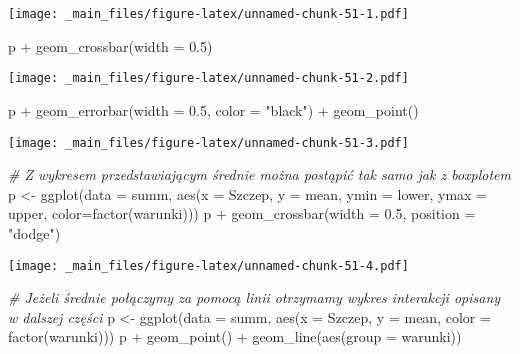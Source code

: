\documentclass[
]{book}
\newenvironment{Shaded}{\begin{snugshade}}{\end{snugshade}}
\newcommand{\AttributeTok}[1]{\textcolor[rgb]{0.77,0.63,0.00}{#1}}
\newcommand{\CommentTok}[1]{\textcolor[rgb]{0.56,0.35,0.01}{\textit{#1}}}
\newcommand{\FloatTok}[1]{\textcolor[rgb]{0.00,0.00,0.81}{#1}}
\newcommand{\FunctionTok}[1]{\textcolor[rgb]{0.00,0.00,0.00}{#1}}
\newcommand{\NormalTok}[1]{#1}
\newcommand{\OtherTok}[1]{\textcolor[rgb]{0.56,0.35,0.01}{#1}}
\newcommand{\SpecialCharTok}[1]{\textcolor[rgb]{0.00,0.00,0.00}{#1}}
\newcommand{\StringTok}[1]{\textcolor[rgb]{0.31,0.60,0.02}{#1}}
\begin{document}
\texttt{[image: \_main\_files/figure-latex/unnamed-chunk-51-1.pdf]}

\begin{Shaded}
\begin{Highlighting}[]
\NormalTok{p }\SpecialCharTok{+} \FunctionTok{geom\_crossbar}\NormalTok{(}\AttributeTok{width =} \FloatTok{0.5}\NormalTok{)}
\end{Highlighting}
\end{Shaded}

\texttt{[image: \_main\_files/figure-latex/unnamed-chunk-51-2.pdf]}

\begin{Shaded}
\begin{Highlighting}[]
\NormalTok{p }\SpecialCharTok{+} \FunctionTok{geom\_errorbar}\NormalTok{(}\AttributeTok{width =} \FloatTok{0.5}\NormalTok{, }\AttributeTok{color =} \StringTok{"black"}\NormalTok{) }\SpecialCharTok{+} \FunctionTok{geom\_point}\NormalTok{()}
\end{Highlighting}
\end{Shaded}

\texttt{[image: \_main\_files/figure-latex/unnamed-chunk-51-3.pdf]}

\begin{Shaded}
\begin{Highlighting}[]
\CommentTok{\# Z wykresem przedstawiającym średnie można postąpić tak samo jak z boxplotem}
\NormalTok{p }\OtherTok{\textless{}{-}} \FunctionTok{ggplot}\NormalTok{(}\AttributeTok{data =}\NormalTok{ summ, }\FunctionTok{aes}\NormalTok{(}\AttributeTok{x =}\NormalTok{ Szczep, }\AttributeTok{y =}\NormalTok{ mean, }\AttributeTok{ymin =}\NormalTok{ lower, }\AttributeTok{ymax =}\NormalTok{ upper, }
                             \AttributeTok{color=}\FunctionTok{factor}\NormalTok{(warunki)))}
\NormalTok{p }\SpecialCharTok{+} \FunctionTok{geom\_crossbar}\NormalTok{(}\AttributeTok{width =} \FloatTok{0.5}\NormalTok{, }\AttributeTok{position =} \StringTok{"dodge"}\NormalTok{)}
\end{Highlighting}
\end{Shaded}

\texttt{[image: \_main\_files/figure-latex/unnamed-chunk-51-4.pdf]}

\begin{Shaded}
\begin{Highlighting}[]
\CommentTok{\# Jeżeli średnie połączymy za pomocą linii otrzymamy wykres interakcji opisany w dalszej części}
\NormalTok{p }\OtherTok{\textless{}{-}} \FunctionTok{ggplot}\NormalTok{(}\AttributeTok{data =}\NormalTok{ summ, }\FunctionTok{aes}\NormalTok{(}\AttributeTok{x =}\NormalTok{ Szczep, }\AttributeTok{y =}\NormalTok{ mean, }\AttributeTok{color =} \FunctionTok{factor}\NormalTok{(warunki)))}
\NormalTok{p }\SpecialCharTok{+} \FunctionTok{geom\_point}\NormalTok{() }\SpecialCharTok{+} \FunctionTok{geom\_line}\NormalTok{(}\FunctionTok{aes}\NormalTok{(}\AttributeTok{group =}\NormalTok{ warunki))}
\end{Highlighting}
\end{Shaded}
\end{document}
